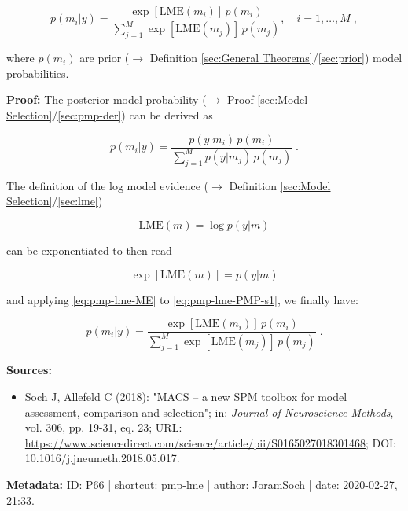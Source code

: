 \documentclass[a4paper,12pt,twoside]{book}
\begin{document}
\begin{equation} \label{eq:pmp-lme-PMP-LME}
p(m_i|y) = \frac{\exp[\mathrm{LME}(m_i)] \, p(m_i)}{\sum_{j=1}^{M} \exp[\mathrm{LME}(m_j)] \, p(m_j)}, \quad i = 1,\ldots,M \; ,
\end{equation}

where $p(m_i)$ are prior ($\rightarrow$ Definition \ref{sec:General Theorems}/\ref{sec:prior}) model probabilities.


\vspace{1em}
\textbf{Proof:} The posterior model probability ($\rightarrow$ Proof \ref{sec:Model Selection}/\ref{sec:pmp-der}) can be derived as

\begin{equation} \label{eq:pmp-lme-PMP-s1}
p(m_i|y) = \frac{p(y|m_i) \, p(m_i)}{\sum_{j=1}^{M} p(y|m_j) \, p(m_j)} \; .
\end{equation}

The definition of the log model evidence ($\rightarrow$ Definition \ref{sec:Model Selection}/\ref{sec:lme})

\begin{equation} \label{eq:pmp-lme-LME}
\mathrm{LME}(m) = \log p(y|m)
\end{equation}

can be exponentiated to then read

\begin{equation} \label{eq:pmp-lme-ME}
\exp\left[ \mathrm{LME}(m) \right] = p(y|m)
\end{equation}

and applying \eqref{eq:pmp-lme-ME} to \eqref{eq:pmp-lme-PMP-s1}, we finally have:

\begin{equation} \label{eq:pmp-lme-PMP-s2}
p(m_i|y) = \frac{\exp[\mathrm{LME}(m_i)] \, p(m_i)}{\sum_{j=1}^{M} \exp[\mathrm{LME}(m_j)] \, p(m_j)} \; .
\end{equation}


\vspace{1em}
\textbf{Sources:}
\begin{itemize}
\item Soch J, Allefeld C (2018): "MACS – a new SPM toolbox for model assessment, comparison and selection"; in: \textit{Journal of Neuroscience Methods}, vol. 306, pp. 19-31, eq. 23; URL: \url{https://www.sciencedirect.com/science/article/pii/S0165027018301468}; DOI: 10.1016/j.jneumeth.2018.05.017.
\end{itemize}


\vspace{1em}
\textbf{Metadata:} ID: P66 | shortcut: pmp-lme | author: JoramSoch | date: 2020-02-27, 21:33.
\vspace{1em}
\end{document}
